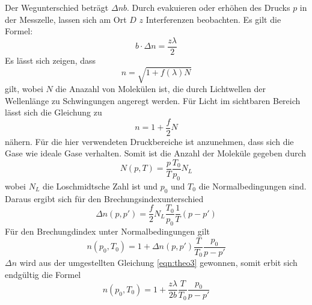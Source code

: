 \FloatBarrier
Der Wegunterschied beträgt $\Delta n b$.
Durch evakuieren oder erhöhen des Drucks $p$ in der Messzelle, lassen sich am Ort $D$ $z$ Interferenzen beobachten.
Es gilt die Formel:
\begin{equation}
    b \cdot \Delta n = \frac{z \lambda}{2}
    \label{eqn:theo3}
\end{equation}
Es lässt sich zeigen, dass
\begin{equation}
    n = \sqrt{1+f(\lambda)N}
\end{equation}
gilt, wobei $N$ die Anazahl von Molekülen ist, die durch Lichtwellen der Wellenlänge zu Schwingungen angeregt werden.
Für Licht im sichtbaren Bereich lässt sich die Gleichung zu
\begin{equation}
    n = 1 + \frac{f}{2}N
\end{equation}
nähern.
Für die hier verwendeten Druckbereiche ist anzunehmen, dass sich die Gase wie ideale Gase verhalten.
Somit ist die Anzahl der Moleküle gegeben durch
\begin{equation}
    N(p,T) = \frac{p}{T} \frac{T_0}{p_0}N_L
\end{equation}
wobei $N_L$ die Loschmidtsche Zahl ist und $p_0$ und $T_0$ die Normalbedingungen sind.
Daraus ergibt sich für den Brechungsindexunterschied
\begin{equation}
    \Delta n(p,p') = \frac{f}{2} N_L \frac{T_0}{p_0}\frac{1}{T}(p-p')
\end{equation}
Für den Brechungdindex unter Normalbedingungen gilt
\begin{equation}
    n(p_0,T_0) = 1 + \Delta n(p,p') \frac{T}{T_0}\frac{p_0}{p-p'}
\end{equation}
$\Delta n$ wird aus der umgestellten Gleichung \eqref{eqn:theo3} gewonnen, somit erbit sich endgültig die Formel
\begin{equation}
    n(p_0,T_0) = 1 + \frac{z \lambda}{2b} \frac{T}{T_0} \frac{p_0}{p-p'}
\end{equation}